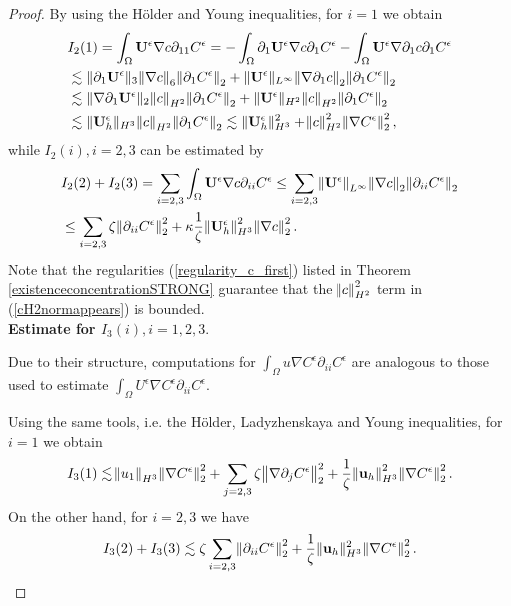 \documentclass[11pt, a4paper]{article}
\begin{document}
\begin{proof}
By using the H\"older and Young inequalities, for $i = 1$ we obtain
%
\begin{equation} \label{cH2normappears}
\begin{split}
& I_2(1) = \int_\Omega \mathbf{U}^\epsilon \nabla c \partial_{11} C^\epsilon = -\int_\Omega \partial_1 \mathbf{U}^\epsilon \nabla c \partial_1 C^\epsilon - \int_\Omega \mathbf{U}^\epsilon \nabla \partial_1 c \partial_1 C^\epsilon \\
& \lesssim \| \partial_1 \mathbf{U}^\epsilon \|_3 \norm{\nabla c}_6 \norm{\partial_1 C^\epsilon}_2 + \| \mathbf{U}^\epsilon \|_{L^\infty} \norm{\nabla \partial_1 c}_2 \norm{\partial_1 C^\epsilon}_2 \\
& \lesssim \| \nabla \partial_1 \mathbf{U}^\epsilon \|_2 \norm{c}_{H^2} \norm{\partial_1 C^\epsilon}_2 + \| \mathbf{U}^\epsilon \|_{H^2} \norm{c}_{H^2} \norm{\partial_1 C^\epsilon}_2 \\
& \lesssim \| \mathbf{U}_h^\epsilon \|_{H^3} \norm{c}_{H^2} \norm{\partial_1 C^\epsilon}_2 \lesssim \| \mathbf{U}_h^\epsilon \|_{H^3}^2 + \norm{c}_{H^2}^2 \norm{\nabla C^\epsilon}_2^2,
\end{split}
\end{equation}
%
while $I_2(i), i = 2,3$ can be estimated by
%
\begin{equation}
\begin{split}
& I_2(2) + I_2(3) = \sum_{i=2,3} \int_\Omega \mathbf{U}^\epsilon \nabla c \partial_{ii} C^\epsilon \leq \sum_{i=2,3} \norm{\mathbf{U}^\epsilon}_{L^\infty} \norm{\nabla c}_2 \norm{\partial_{ii} C^\epsilon}_2 \\
& \leq \sum_{i=2,3} \zeta \norm{\partial_{ii} C^\epsilon}_2^2 + \kappa \frac{1}{\zeta} \norm{\mathbf{U}_h^\epsilon}_{H^3}^2 \norm{\nabla c}_2^2.
\end{split}
\end{equation}
%
Note that the regularities (\ref{regularity_c_first}) listed in Theorem \ref{existenceconcentrationSTRONG} guarantee that the $\norm{c}_{H^2}^2$ term in (\ref{cH2normappears}) is bounded.\\[0.5cm]
\textbf{Estimate for $I_3(i), i=1,2,3.$}

Due to their structure, computations for $\int_\Omega u \nabla C^\epsilon \partial_{ii} C^\epsilon$ are analogous to those used to estimate $ \int_\Omega U^\epsilon \nabla C^\epsilon \partial_{ii} C^\epsilon.$

Using the same tools, i.e. the H\"older, Ladyzhenskaya and Young inequalities, for $i=1$ we obtain
%
\begin{equation}
I_3(1) \lesssim \norm{u_1}_{H^3} \norm{\nabla C^\epsilon}_2^2 + \sum_{j=2,3} \zeta \norm{\nabla \partial_j C^\epsilon}_2^2 + \frac{1}{\zeta} \norm{\mathbf{u}_h}_{H^3}^2 \norm{\nabla C^\epsilon}_2^2.
\end{equation}
%
On the other hand, for $i = 2,3$ we have
%
\begin{equation}
I_3(2) + I_3(3) \lesssim \zeta \sum_{i=2,3} \norm{\partial_{ii} C^\epsilon}_2^2 + \frac{1}{\zeta} \| \mathbf{u}_h \| _ {H^3} ^ 2 \norm{\nabla C^\epsilon}_2^2.
\end{equation}


\end{proof}
\end{document}
